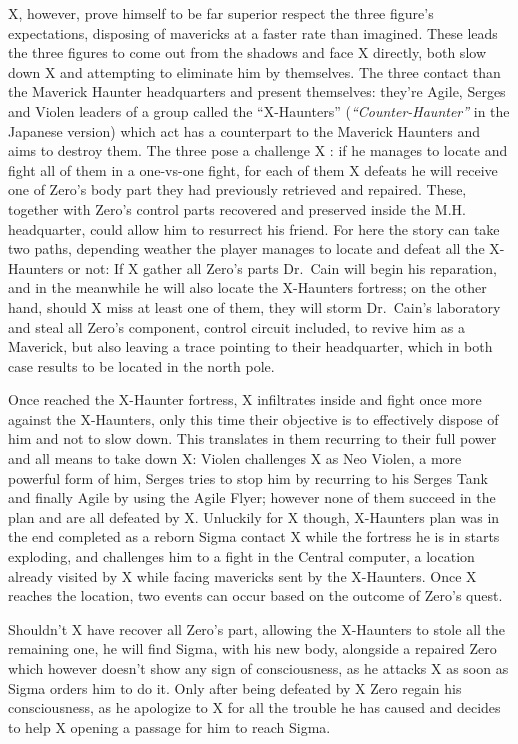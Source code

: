 X, however, prove himself to be far superior respect the three figure's expectations, disposing of mavericks at a faster rate than imagined. These leads the three figures to come out from the shadows and face X directly, both slow down X and attempting to eliminate him by themselves. The three contact than the Maverick Haunter headquarters and present themselves: they're Agile, Serges and Violen leaders of a group called the ``X-Haunters'' (\textit{``Counter-Haunter''} in the Japanese version) which act has a counterpart to the Maverick Haunters and aims to destroy them. The three pose a challenge X : if he manages to locate and fight all of them in a one-vs-one fight, for each of them X defeats he will receive one of Zero's body part they had previously retrieved and repaired. These, together with Zero's control parts recovered and preserved inside the M.H. headquarter, could allow him to resurrect his friend. For here the story can take two paths, depending weather the player manages to locate and defeat all the X-Haunters or not:
If X gather all Zero's parts Dr.~Cain will begin his reparation, and in the meanwhile he will also locate the X-Haunters fortress; on the other hand, should X miss at least one of them, they will storm Dr.~Cain's laboratory and steal all Zero's component, control circuit included, to revive him as a Maverick, but also leaving a trace pointing to their headquarter, which in both case results to be located in the north pole.

Once reached the X-Haunter fortress, X infiltrates inside and fight once more against the X-Haunters, only this time their objective is to effectively dispose of him and not to slow down. This translates in them recurring to their full power and all means to take down X: Violen challenges X as Neo Violen, a more powerful form of him, Serges tries to stop him by recurring to his Serges Tank and finally Agile by using the Agile Flyer; however none of them succeed in the plan and are all defeated by X. Unluckily for X though, X-Haunters plan was in the end completed as a reborn Sigma contact X while the fortress he is in starts exploding, and challenges him to a fight in the Central computer, a location already visited by X while facing mavericks sent by the X-Haunters. Once X reaches the location, two events can occur based on the outcome of Zero's quest.

Shouldn't X have recover all Zero's part, allowing the X-Haunters to stole all the remaining one, he will find Sigma, with his new body, alongside a repaired Zero which however doesn't show any sign of consciousness, as he attacks X as soon as Sigma orders him to do it. Only after being defeated by X Zero regain his consciousness, as he apologize to X for all the trouble he has caused and decides to help X opening a passage for him to reach Sigma.


